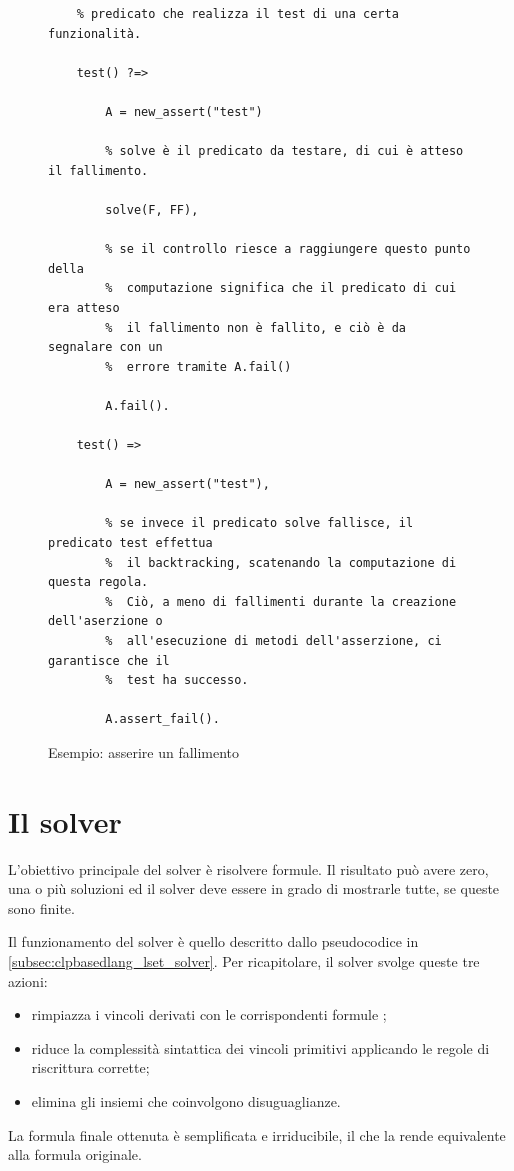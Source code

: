 \documentclass[12pt,a4paper,openright]{book} %
\begin{document}
\begin{figure}
	\begin{verbatim}
	% predicato che realizza il test di una certa funzionalità.

	test() ?=>

	    A = new_assert("test")

	    % solve è il predicato da testare, di cui è atteso il fallimento.

	    solve(F, FF),

	    % se il controllo riesce a raggiungere questo punto della
	    %  computazione significa che il predicato di cui era atteso
	    %  il fallimento non è fallito, e ciò è da segnalare con un
	    %  errore tramite A.fail()

	    A.fail().

	test() =>

	    A = new_assert("test"),

	    % se invece il predicato solve fallisce, il predicato test effettua
	    %  il backtracking, scatenando la computazione di questa regola.
	    %  Ciò, a meno di fallimenti durante la creazione dell'aserzione o
	    %  all'esecuzione di metodi dell'asserzione, ci garantisce che il
	    %  test ha successo.

	    A.assert_fail().
	\end{verbatim}
 	\caption{Esempio: asserire un fallimento}
	\label{fig:example_unittest_assertfail}
\end{figure}

\section{Il solver}
\label{sec:lsetpicat_solver}

L'obiettivo principale del solver \lset{} è risolvere formule. Il
risultato può avere zero, una o più soluzioni ed il solver deve essere
in grado di mostrarle tutte, se queste sono finite.

Il funzionamento del solver è quello descritto dallo pseudocodice in
\ref{subsec:clpbasedlang_lset_solver}. Per ricapitolare, il solver
svolge queste tre azioni:
\begin{itemize}
	\item rimpiazza i vincoli derivati con le corrispondenti
          formule \lset{};
	\item riduce la complessità sintattica dei vincoli primitivi
          applicando le regole di riscrittura corrette;
	\item elimina gli insiemi che coinvolgono disuguaglianze.
\end{itemize}
La formula finale ottenuta è semplificata e irriducibile, il che la
rende equivalente alla formula originale.
\end{document}
